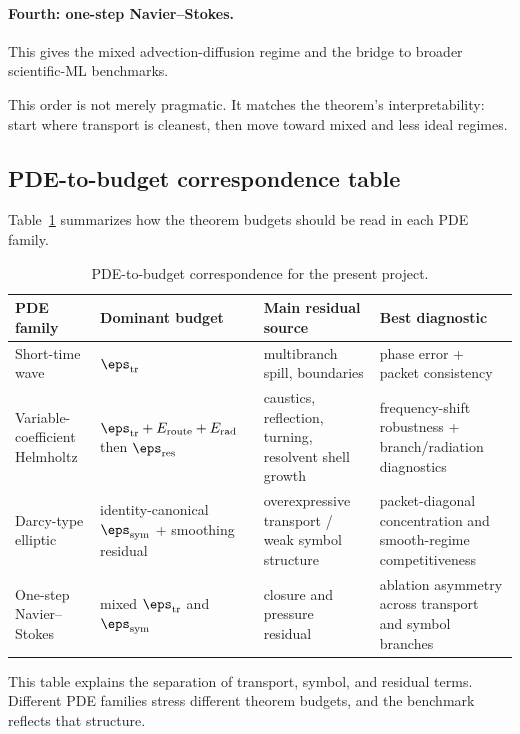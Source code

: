 \paragraph{Fourth: one-step Navier--Stokes.}
This gives the mixed advection-diffusion regime and the bridge to broader scientific-ML benchmarks.

This order is not merely pragmatic. It matches the theorem's interpretability: start where transport is cleanest, then move toward mixed and less ideal regimes.

\subsection{PDE-to-budget correspondence table}

Table~\ref{tab:pdebudget} summarizes how the theorem budgets should be read in each PDE family.

\begin{table}[t]
\centering
\caption{PDE-to-budget correspondence for the present project.}
\label{tab:pdebudget}
\begin{tabular}{p{}p{}p{}p{}}
\toprule
PDE family & Dominant budget & Main residual source & Best diagnostic \\
\midrule
Short-time wave & $\eps_{\mathrm{tr}}$ & multibranch spill, boundaries & phase error + packet consistency \\
Variable-coefficient Helmholtz & $\eps_{\mathrm{tr}}+E_{\mathrm{route}}+E_{\mathrm{rad}}$ then $\eps_{\mathrm{res}}$ & caustics, reflection, turning, resolvent shell growth & frequency-shift robustness + branch/radiation diagnostics \\
Darcy-type elliptic & identity-canonical $\eps_{\mathrm{sym}}$ + smoothing residual & overexpressive transport / weak symbol structure & packet-diagonal concentration and smooth-regime competitiveness \\
One-step Navier--Stokes & mixed $\eps_{\mathrm{tr}}$ and $\eps_{\mathrm{sym}}$ & closure and pressure residual & ablation asymmetry across transport and symbol branches \\
\bottomrule
\end{tabular}
\end{table}

This table explains the separation of transport, symbol, and residual terms. Different PDE families stress different theorem budgets, and the benchmark reflects that structure.

